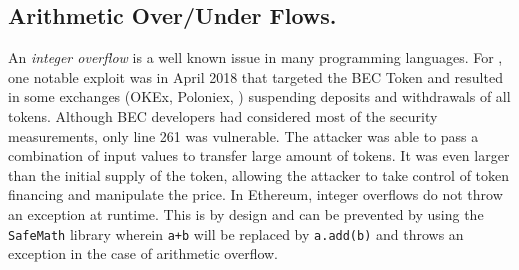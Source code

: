 \subsection{Arithmetic Over/Under Flows.}\label{subsec:ovf}
An \textit{integer overflow} is a well known issue in many programming languages. For \erc, one notable exploit was in April 2018 that targeted the BEC Token\cite{BECToken} and resulted in some exchanges (\eg OKEx, Poloniex, \etc) suspending deposits and withdrawals of all tokens. Although BEC developers had considered most of the security measurements, only line 261 was vulnerable\cite{Osiris}\cite{PeckShield}. The attacker was able to pass a combination of input values to transfer large amount of tokens\cite{Overflow}. It was even larger than the initial supply of the token, allowing the attacker to take control of token financing and manipulate the price. In Ethereum, integer overflows do not throw an exception at runtime. This is by design and can be prevented by using the \texttt{SafeMath} library\cite{SafeMath} wherein \texttt{a+b} will be replaced by \texttt{a.add(b)} and throws an exception in the case of arithmetic overflow.

